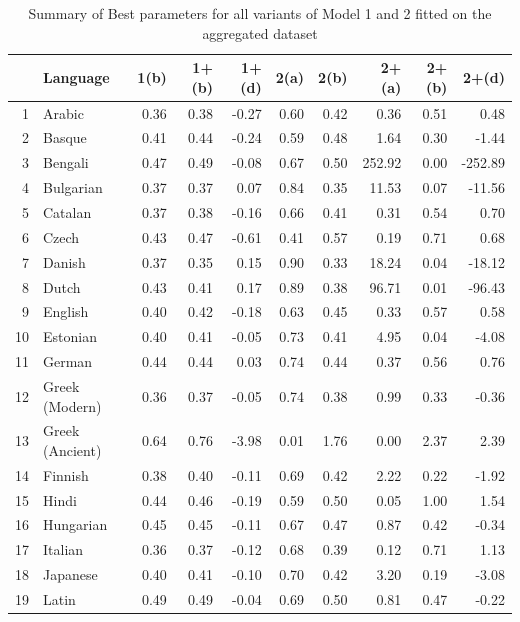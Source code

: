 \documentclass[a4paper]{article}
\begin{document}
\begin{table}[hhbtp]
	\centering
	\caption{Summary of Best parameters for all variants of Model 1 and 2 fitted on the aggregated dataset}
	\begin{tabular}{rlrrrrrrrr}
		\hline
		& Language & 1(b) & 1+(b) & 1+(d) & 2(a) & 2(b) & 2+(a) & 2+(b) & 2+(d) \\ 
		\hline
		1 & Arabic & 0.36 & 0.38 & -0.27 & 0.60 & 0.42 & 0.36 & 0.51 & 0.48 \\ 
		2 & Basque & 0.41 & 0.44 & -0.24 & 0.59 & 0.48 & 1.64 & 0.30 & -1.44 \\ 
		3 & Bengali & 0.47 & 0.49 & -0.08 & 0.67 & 0.50 & 252.92 & 0.00 & -252.89 \\ 
		4 & Bulgarian & 0.37 & 0.37 & 0.07 & 0.84 & 0.35 & 11.53 & 0.07 & -11.56 \\ 
		5 & Catalan & 0.37 & 0.38 & -0.16 & 0.66 & 0.41 & 0.31 & 0.54 & 0.70 \\ 
		6 & Czech & 0.43 & 0.47 & -0.61 & 0.41 & 0.57 & 0.19 & 0.71 & 0.68 \\ 
		7 & Danish & 0.37 & 0.35 & 0.15 & 0.90 & 0.33 & 18.24 & 0.04 & -18.12 \\ 
		8 & Dutch & 0.43 & 0.41 & 0.17 & 0.89 & 0.38 & 96.71 & 0.01 & -96.43 \\ 
		9 & English & 0.40 & 0.42 & -0.18 & 0.63 & 0.45 & 0.33 & 0.57 & 0.58 \\ 
		10 & Estonian & 0.40 & 0.41 & -0.05 & 0.73 & 0.41 & 4.95 & 0.04 & -4.08 \\ 
		11 & German & 0.44 & 0.44 & 0.03 & 0.74 & 0.44 & 0.37 & 0.56 & 0.76 \\ 
		12 & Greek (Modern) & 0.36 & 0.37 & -0.05 & 0.74 & 0.38 & 0.99 & 0.33 & -0.36 \\ 
		13 & Greek (Ancient) & 0.64 & 0.76 & -3.98 & 0.01 & 1.76 & 0.00 & 2.37 & 2.39 \\ 
		14 & Finnish & 0.38 & 0.40 & -0.11 & 0.69 & 0.42 & 2.22 & 0.22 & -1.92 \\ 
		15 & Hindi & 0.44 & 0.46 & -0.19 & 0.59 & 0.50 & 0.05 & 1.00 & 1.54 \\ 
		16 & Hungarian & 0.45 & 0.45 & -0.11 & 0.67 & 0.47 & 0.87 & 0.42 & -0.34 \\ 
		17 & Italian & 0.36 & 0.37 & -0.12 & 0.68 & 0.39 & 0.12 & 0.71 & 1.13 \\ 
		18 & Japanese & 0.40 & 0.41 & -0.10 & 0.70 & 0.42 & 3.20 & 0.19 & -3.08 \\ 
		19 & Latin & 0.49 & 0.49 & -0.04 & 0.69 & 0.50 & 0.81 & 0.47 & -0.22 \\ 

\end{tabular}
\end{table}
\end{document}
